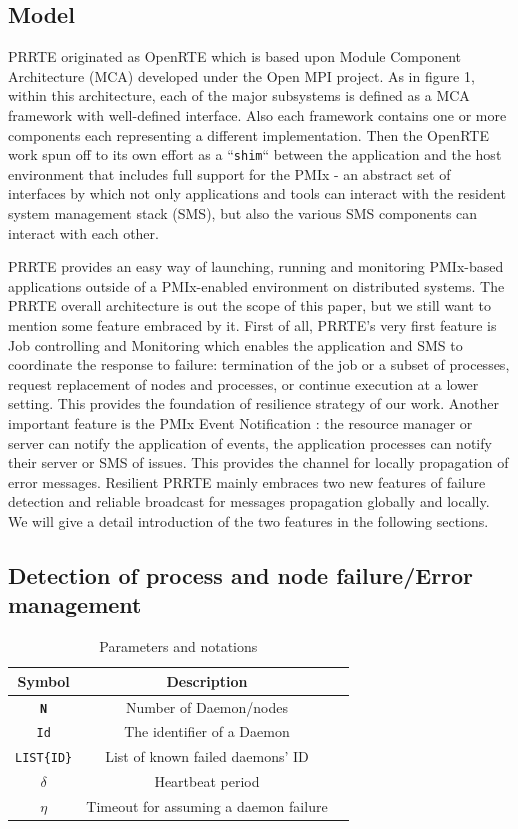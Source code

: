 \documentclass[sigconf]{acmart}
\begin{document}
\subsection{Model}
PRRTE originated as OpenRTE \cite{Castain05} which is based upon Module Component Architecture (MCA) developed under the Open MPI project. As in figure 1, within this architecture, each of the major subsystems is defined as a MCA framework with well-defined interface. Also each framework contains one or more components each representing a different implementation. Then the OpenRTE work spun off to its own effort as a ``\verb|shim|`` between the application and the host environment that includes full support for the PMIx \cite{CASTAIN18} - an abstract set of interfaces by which not only applications and tools can interact with the resident system management stack (SMS), but also the various SMS components can interact with each other. 

PRRTE provides an easy way of launching, running and monitoring PMIx-based applications outside of a PMIx-enabled environment on distributed systems. The PRRTE overall architecture is out the scope of this paper, but we still want to mention some feature embraced by it. First of all, PRRTE's very first feature is Job controlling and Monitoring \cite{Ralph15} which enables the application and SMS to coordinate the response to failure: termination of the job or a subset of processes, request replacement of nodes and processes, or continue execution at a lower setting. This provides the foundation of resilience strategy of our work. Another important feature is the PMIx Event Notification \cite{Ralph002} : the resource manager or server can notify the application of events, the application processes can notify their server or SMS of issues. This provides the channel for locally propagation of error messages. Resilient PRRTE mainly embraces two new features of failure detection and reliable broadcast for messages propagation globally and locally. We will give a detail introduction of the two features in the following sections.

\subsection{Detection of process and node failure/Error management}

\begin{table}
  \caption{Parameters and notations}
  \label{tab:parameters}
  \begin{tabular}{ccl}
    \toprule
    Symbol & Description \\
    \midrule
    \texttt{\bf N} & Number of Daemon/nodes \\
    \texttt{Id} & The identifier of a Daemon \\
    \texttt{LIST\{ID\}} & List of known failed daemons' ID \\
    $\delta$ & Heartbeat period \\
    $\eta$ & Timeout for assuming a daemon failure\\
    \bottomrule
  \end{tabular}
\end{table}
\end{document}
